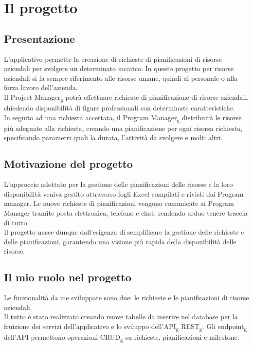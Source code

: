 \section{Il progetto}
\subsection{Presentazione}
L'applicativo permette la creazione di richieste di pianificazioni di risorse aziendali per svolgere un determinato incarico. In questo progetto per risorse aziendali si fa sempre riferimento alle risorse umane, quindi al personale o alla forza lavoro dell'azienda.\\
Il Project Manager\textsubscript{g} potrà effettuare richieste di pianificazione di risorse aziendali, chiedendo disponibilità di figure professionali con determinate caratteristiche.\\ 
In seguito ad una richiesta accettata, il Program Manager\textsubscript{g} distribuirà le risorse più adeguate alla richiesta, creando una pianificazione per ogni risorsa richiesta, specificando parametri quali la durata, l'attività da svolgere e molti altri.\\

\subsection{Motivazione del progetto}
L'approccio adottato per la gestione delle pianificazioni delle risorse e la loro disponibilità veniva gestito attraverso fogli Excel compilati e rivisti dai Program manager. Le nuove richieste di pianificazioni vengono comunicate ai Program Manager tramite posta elettronica, telefono e chat, rendendo arduo tenere traccia di tutto.\\
Il progetto nasce dunque dall’esigenza di semplificare la gestione delle richieste e delle pianificazioni, garantendo una visione più rapida della disponibilità delle risorse.\\


\subsection{Il mio ruolo nel progetto}
Le funzionalità da me sviluppate sono due: le richieste e le pianificazioni di risorse aziendali.\\
Il tutto è stato realizzato creando nuove tabelle da inserire nel database per la fruizione dei servizi dell'applicativo e lo sviluppo dell'API\textsubscript{g} REST\textsubscript{g}. Gli endpoint\textsubscript{g} dell'API permettono operazioni CRUD\textsubscript{g} su richieste, pianificazioni e milestone.\\


